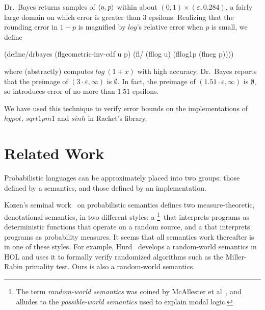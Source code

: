 \documentclass{llncs}
\begin{document}
Dr.~Bayes returns samples of $\langle{u,p}\rangle$ within about $(0,1) \times (\varepsilon,0.284)$, a fairly large domain on which error is greater than $3$ epsilons.
Realizing that the rounding error in $1-p$ is magnified by $log$'s relative error when $p$ is small, we define
\vspace{-0.5\baselineskip}
\begin{center}
\begin{schemedisplay}
(define/drbayes (flgeometric-inv-cdf u p)
  (fl/ (fllog u) (fllog1p (flneg p))))
\end{schemedisplay}
\end{center}
where  (abstractly) computes $log~(1+x)$ with high accuracy.
Dr.~Bayes reports that the preimage of $(3 \cdot \varepsilon,\infty)$ is $\emptyset$.
In fact, the preimage of $(1.51 \cdot \varepsilon,\infty)$ is $\emptyset$, so  introduces error of no more than $1.51$ epsilons.

We have used this technique to verify error bounds on the implementations of $hypot$, $sqrt1pm1$ and $sinh$ in Racket's  library.



\section{Related Work}

Probabilistic languages can be approximately placed into two groups: those defined by a semantics, and those defined by an implementation.

\newcommand{\randomworldfootnote}{\footnote{The term \emph{random-world semantics} was coined by McAllester et al~\cite{cit:mcallester-2008tr-random-world}, and alludes to the \emph{possible-world semantics} used to explain modal logic.}}

Kozen's seminal work~\cite{cit:kozen-1979fcs-prob-programs-short} on probabilistic semantics defines two measure-theoretic, denotational semantics, in two different styles: a \randomworldfootnote\ that interprets programs as deterministic functions that operate on a random source, and a  that interprets programs as probability measures.
It seems that all semantics work thereafter is in one of these styles.
For example, Hurd~\cite{cit:hurd-2002thesis} develops a random-world semantics in HOL and uses it to formally verify randomized algorithms such as the Miller-Rabin primality test.
Ours is also a random-world semantics.
\end{document}
